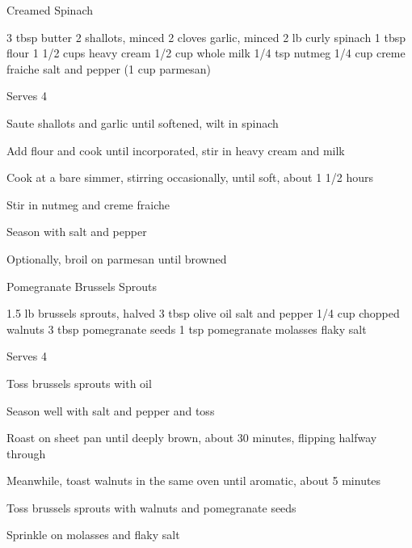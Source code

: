 \begin{recipe}{Creamed Spinach}{\vegetarian{}}
\begin{ingredients}
3 tbsp butter
2 shallots, minced
2 cloves garlic, minced
2 lb curly spinach
1 tbsp flour
1 1/2 cups heavy cream
1/2 cup whole milk
1/4 tsp nutmeg
1/4 cup creme fraiche
salt and pepper
(1 cup parmesan)
\end{ingredients}
\nextcolumn
Serves 4
\begin{steps}
    \item Saute shallots and garlic until softened, wilt in spinach
    \item Add flour and cook until incorporated, stir in heavy cream and milk
    \item Cook at a bare simmer, stirring occasionally, until soft, about 1 1/2 hours
    \item Stir in nutmeg and creme fraiche
    \item Season with salt and pepper
    \item Optionally, broil on parmesan until browned
\end{steps}
\end{recipe}

\begin{recipe}{Pomegranate Brussels Sprouts}{\vegetarian{}}
\begin{ingredients}
1.5 lb brussels sprouts, halved
3 tbsp olive oil
salt and pepper
1/4 cup chopped walnuts
3 tbsp pomegranate seeds
1 tsp pomegranate \ibreak molasses
flaky salt
\end{ingredients}
\nextcolumn
Serves 4
\begin{steps}
    \item Toss brussels sprouts with oil
    \item Season well with salt and pepper and toss
    \item Roast on sheet pan until deeply brown, about 30 minutes, flipping halfway through
    \item Meanwhile, toast walnuts in the same oven until aromatic, about 5 minutes
    \item Toss brussels sprouts with walnuts and pomegranate seeds
    \item Sprinkle on molasses and flaky salt
\end{steps}
\end{recipe}


